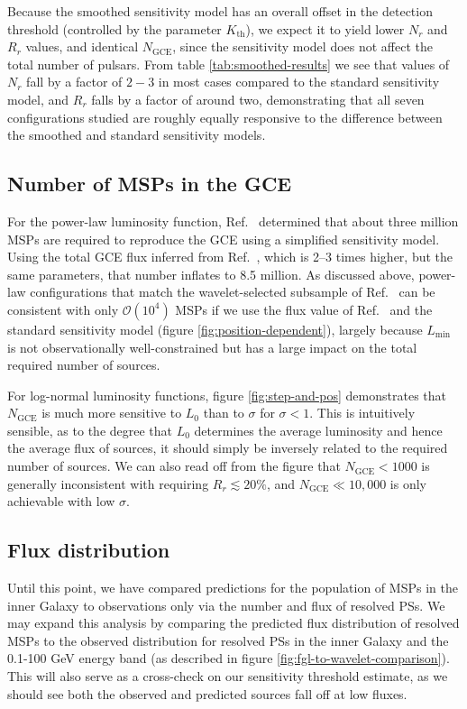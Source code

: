 \documentclass[letter,11pt]{article}
\begin{document}
Because the smoothed sensitivity model has an overall offset in the detection threshold (controlled by the parameter $K_\text{th}$), we expect it to yield lower $N_r$ and $R_r$ values, and identical $N_\text{GCE}$, since the sensitivity model does not affect the total number of pulsars. From table \ref{tab:smoothed-results} we see that values of $N_r$ fall by a factor of $2-3$ in most cases compared to the standard sensitivity model, and $R_r$ falls by a factor of around two, demonstrating that all seven configurations studied are roughly equally responsive to the difference between the smoothed and standard sensitivity models.

\subsection{Number of MSPs in the GCE}
\label{sec:num-msps}
For the power-law luminosity function, Ref.~\cite{Zhong:2019ycb} determined that about three million MSPs are required to reproduce the GCE using a simplified sensitivity model. Using the total GCE flux inferred from Ref.~\cite{DiMauro:2021raz}, which is 2--3 times higher, but the same parameters, that number inflates to 8.5 million. As discussed above, power-law configurations that match the wavelet-selected subsample of Ref.~\cite{Zhong:2019ycb} can be consistent with only $\mathcal{O}(10^4)$ MSPs if we use the flux value of Ref.~\cite{DiMauro:2021raz} and the standard sensitivity model (figure \ref{fig:position-dependent}), largely because $L_\text{min}$ is not observationally well-constrained but has a large impact on the total required number of sources.

For log-normal luminosity functions, figure \ref{fig:step-and-pos} demonstrates that $N_\text{GCE}$ is much more sensitive to $L_0$ than to $\sigma$ for $\sigma < 1$. This is intuitively sensible, as to the degree that $L_0$ determines the average luminosity and hence the average flux of sources, it should simply be inversely related to the required number of sources. We can also read off from the figure that $N_\text{GCE} < 1000$ is generally inconsistent with requiring $R_r \lesssim 20\%$, and $N_\text{GCE} \ll 10,000$ is only achievable with low $\sigma$.

\subsection{Flux distribution}
\label{sec:flux-distribution}
Until this point, we have compared predictions for the population of MSPs in the inner Galaxy to observations only via the number and flux of resolved PSs. We may expand this analysis by comparing the predicted flux distribution of resolved MSPs to the observed distribution for resolved PSs in the inner Galaxy and the 0.1-100 GeV energy band (as described in figure \ref{fig:fgl-to-wavelet-comparison}). This will also serve as a cross-check on our sensitivity threshold estimate, as we should see both the observed and predicted sources fall off at low fluxes.
\end{document}
